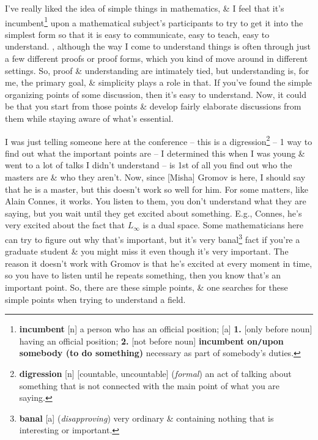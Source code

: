 \documentclass[oneside]{book}
\numberwithin{equation}{section}
\begin{document}
I've really liked the idea of simple things in mathematics, \& I feel that it's incumbent\footnote{\textbf{incumbent} [n] a person who has an official position; [a] \textbf{1.} [only before noun] having an official position; \textbf{2.} [not before noun] \textbf{incumbent on\texttt{/}upon somebody (to do something)} necessary as part of somebody's duties.} upon a mathematical subject's participants to try to get it into the simplest form so that it is easy to communicate, easy to teach, easy to understand. , although the way I come to understand things is often through just a few different proofs or proof forms, which you kind of move around in different settings. So, proof \& understanding are intimately tied, but understanding is, for me, the primary goal, \& simplicity plays a role in that. If you've found the simple organizing points of some discussion, then it's easy to understand. Now, it could be that you start from those points \& develop fairly elaborate discussions from them while staying aware of what's essential.

I was just telling someone here at the conference -- this is a digression\footnote{\textbf{digression} [n] [countable, uncountable] (\textit{formal}) an act of talking about something that is not connected with the main point of what you are saying.} -- 1 way to find out what the important points are -- I determined this when I was young \& went to a lot of talks I didn't understand -- is 1st of all you find out who the masters are \& who they aren't. Now, since [Misha] Gromov is here, I should say that he is a master, but this doesn't work so well for him. For some matters, like Alain Connes, it works. You listen to them, you don't understand what they are saying, but you wait until they get excited about something. E.g., Connes, he's very excited about the fact that $L_\infty$ is a dual space. Some mathematicians here can try to figure out why that's important, but it's very banal\footnote{\textbf{banal} [a] (\textit{disapproving}) very ordinary \& containing nothing that is interesting or important.} fact if you're a graduate student \& you might miss it even though it's very important. The reason it doesn't work with Gromov is that he's excited at every moment in time, so you have to listen until he repeats something, then you know that's an important point. So, there are these simple points, \& one searches for these simple points when trying to understand a field.
\end{document}

